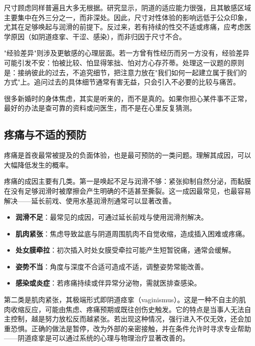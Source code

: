 \documentclass[12pt,UTF8]{ctexbook}
\newcommand{\keyword}[1]{\textbf{#1}}
\begin{document}
尺寸顾虑同样普遍且大多无根据。研究显示，阴道的适应能力很强，且其敏感区域主要集中在外三分之一，而非深处。因此，尺寸对性体验的影响远低于公众印象，尤其在足够唤起与润滑的前提下。反过来，若有持续的性交不适或疼痛，应考虑医学原因（如阴道痉挛、干涩、感染），而非归因于尺寸不合。

"经验差异"则涉及更敏感的心理层面。若一方曾有性经历而另一方没有，经验差异可能引发不安：怕被比较、怕显得笨拙、怕对方心存芥蒂。处理这一议题的原则是：接纳彼此的过去，不追究细节，把注意力放在"我们如何一起建立属于我们的方式"上。追问过去的具体细节通常有害无益，只会引入不必要的比较与痛苦。

\begin{tcolorbox}[colback=pink!5!white,colframe=red!50!black,title=贴心小叮咛]
	很多新婚时的身体焦虑，其实是听来的，而不是真的。如果你担心某件事不正常，最好的办法是查可靠的资料或问医生，而不是在心里反复猜测。
\end{tcolorbox}
\subsection{疼痛与不适的预防}

疼痛是首夜最常被提及的负面体验，也是最可预防的一类问题。理解其成因，可以大幅降低发生的概率。

疼痛的成因主要有几类。第一是唤起不足与润滑不够：紧张抑制自然分泌，而黏膜在没有足够润滑时被摩擦会产生明确的不适甚至撕裂。这一成因最常见，也最容易解决——延长前戏、使用水基润滑剂通常可以显著改善。

\begin{itemize}
	\item \keyword{润滑不足}：最常见的成因，可通过延长前戏与使用润滑剂解决。
	\item \keyword{肌肉紧张}：焦虑导致盆底与阴道周围肌肉不自觉收缩，造成插入困难或疼痛。
	\item \keyword{处女膜牵拉}：初次插入时处女膜受牵拉可能产生短暂锐痛，通常会缓解。
	\item \keyword{姿势不当}：角度与深度不合适可造成不适，调整姿势常能改善。
	\item \keyword{感染或炎症}：若疼痛持续或伴异常分泌物，需就医排查感染。
\end{itemize}

第二类是肌肉紧张，其极端形式即阴道痉挛（vaginismus）。这是一种不自主的肌肉收缩反应，可能由焦虑、疼痛预期或既往创伤史触发。它的特点是当事人无法自主控制，越是努力放松反而越紧张。若出现这种情况，强行进入不仅无效，还会加重恐惧。正确的做法是暂停，改为外部的亲密接触，并在条件允许时寻求专业帮助——阴道痉挛是可以通过系统的心理与物理治疗显著改善的。
\end{document}
